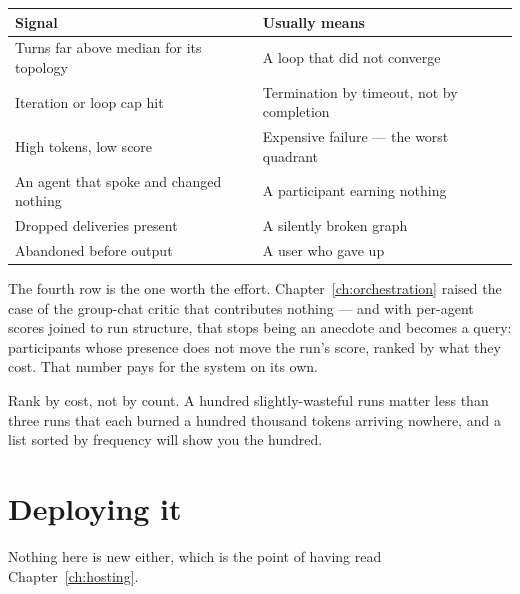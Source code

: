 \begin{center}
\small
\begin{tabularx}{\linewidth}{@{}lX@{}}
\toprule
\textbf{Signal} & \textbf{Usually means} \\
\midrule
Turns far above median for its topology & A loop that did not converge \\[4pt]
Iteration or loop cap hit & Termination by timeout, not by completion \\[4pt]
High tokens, low score & Expensive failure --- the worst quadrant \\[4pt]
An agent that spoke and changed nothing & A participant earning nothing \\[4pt]
Dropped deliveries present & A silently broken graph \\[4pt]
Abandoned before output & A user who gave up \\
\bottomrule
\end{tabularx}
\end{center}

\begin{note}
The fourth row is the one worth the effort. Chapter~\ref{ch:orchestration} raised
the case of the group-chat critic that contributes nothing --- and with per-agent
scores joined to run structure, that stops being an anecdote and becomes a
query: participants whose presence does not move the run's score, ranked by what
they cost. That number pays for the system on its own.
\end{note}

Rank by cost, not by count. A hundred slightly-wasteful runs matter less than
three runs that each burned a hundred thousand tokens arriving nowhere, and a
list sorted by frequency will show you the hundred.


\section{Deploying it}
\label{sec:cap-deploy}

Nothing here is new either, which is the point of having read
Chapter~\ref{ch:hosting}.

